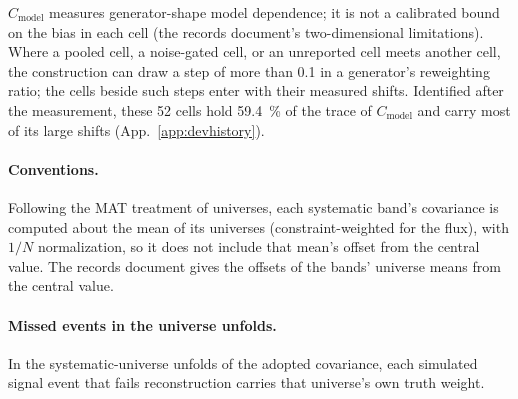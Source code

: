 $C_{\mathrm{model}}$ measures generator-shape model dependence; it is not a calibrated bound on the bias in each cell (the records document's two-dimensional limitations). Where a pooled cell, a noise-gated cell, or an unreported cell meets another cell, the construction can draw a step of more than 0.1 in a generator's reweighting ratio; the cells beside such steps enter with their measured shifts. Identified after the measurement, these 52 cells hold \SI{59.4}{\percent} of the trace of $C_{\mathrm{model}}$ and carry most of its large shifts (App.~\ref{app:devhistory}).

\paragraph{Conventions.} Following the MAT treatment of universes, each systematic band's covariance is computed about the mean of its universes (constraint-weighted for the flux), with $1/N$ normalization, so it does not include that mean's offset from the central value. The records document gives the offsets of the bands' universe means from the central value.

\paragraph{Missed events in the universe unfolds.} In the systematic-universe unfolds of the adopted covariance, each simulated signal event that fails reconstruction carries that universe's own truth weight.


